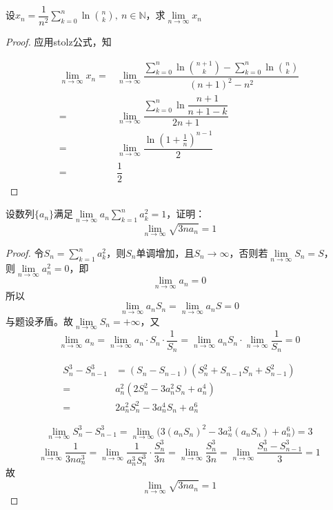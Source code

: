\begin{proposition}
    
    设$x_n = \dfrac{1}{n^2} \sum\limits_{k=0}^{n}{\ln{\binom{n}{k}}},\ n\in\mathbb{N}$，求$\lim\limits_{n\to\infty}{x_n}$

\end{proposition}

\begin{proof}
    
    应用\textup{stolz}公式，知

    \begin{align*}
        \lim\limits_{n\to\infty}{x_n}  = & \lim\limits_{n\to\infty}{\dfrac{\sum\limits_{k=0}^{n}{\ln{\binom{n+1}{k}}} - \sum\limits_{k=0}^{n}{\ln{\binom{n}{k}}}}{(n+1)^2 - n^2}} \\
        = & \lim\limits_{n\to\infty}{\dfrac{\sum\limits_{k=0}^{n}{\ln{\dfrac{n+1}{n+1-k}}}}{2n+1}} \\
        = & \lim\limits_{n\to\infty}{\dfrac{\ln{(1+\frac{1}{n})^{n-1}}}{2}} \\
        = & \dfrac{1}{2}
    \end{align*}

\end{proof}

\begin{proposition}
    
    设数列$\{a_n\}$满足$\lim\limits_{n\to\infty}{a_n\sum\limits_{k=1}^{n}{a_k^2}} = 1$，证明：
    $$\lim\limits_{n\to\infty}{\sqrt{3na_n}} = 1$$

\end{proposition}

\begin{proof}

    令$S_n = \sum\limits_{k=1}^{n}{a_k^2}$，则$S_n$单调增加，且$S_n\to\infty$，否则若$\lim\limits_{n\to\infty}{S_n} = S$，\\
    则$\lim\limits_{n\to\infty}{a_n^2} = 0$，即
    $$\lim\limits_{n\to\infty}{a_n} = 0$$
    所以
    $$\lim\limits_{n\to\infty}{a_nS_n} = \lim\limits_{n\to\infty}{a_nS} = 0$$
    与题设矛盾。故$\lim\limits_{n\to\infty}{S_n} = +\infty$，又
    $$\lim\limits_{n\to\infty}{a_n} = \lim\limits_{n\to\infty}{a_n \cdot S_n \cdot \dfrac{1}{S_n}} = \lim\limits_{n\to\infty}{a_nS_n} \cdot \lim\limits_{n\to\infty}{\dfrac{1}{S_n}} = 0$$

    \begin{align*}
        S_n^3 - S_{n-1}^3 &= (S_n - S_{n-1}) (S_n^2 + S_{n-1}S_n + S_{n-1}^2) \\
        = & a_n^2 (2S_n^2 - 3a_n^2S_n + a_n^4) \\
        = & 2a_n^2S_n^2 - 3a_n^4S_n + a_n^6 
    \end{align*}
    
    $$\lim\limits_{n\to\infty}{S_n^3 - S_{n-1}^3}= \lim\limits_{n\to\infty}{\big( 3(a_nS_n)^2 - 3a_n^3(a_nS_n) + a_n^6 \big)} = 3$$
    $$\lim\limits_{n\to\infty}{\dfrac{1}{3na_n^3}} = \lim\limits_{n\to\infty}{\dfrac{1}{a_n^3S_n^3} \cdot \dfrac{S_n^3}{3n}} = \lim\limits_{n\to\infty}{\dfrac{S_n^3}{3n}} = \lim\limits_{n\to\infty}{\dfrac{S_n^3 - S_{n-1}^3}{3}} = 1$$
    故
    $$\lim\limits_{n\to\infty}{\sqrt{3na_n}} = 1$$

\end{proof}

